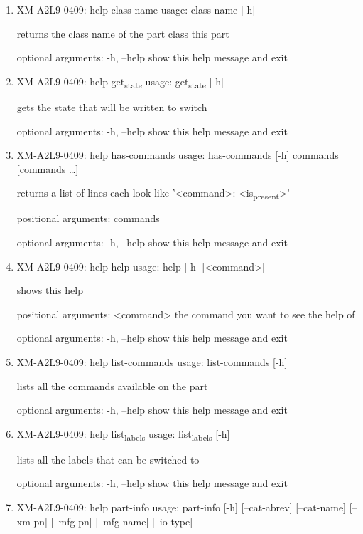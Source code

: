 \documentclass[11pt]{article}
\begin{document}
\begin{enumerate}
\item XM-A2L9-0409: help class-name
\label{sec:orgf703706}
usage: class-name [-h]

returns the class name of the part class this part

optional arguments:
  -h, --help  show this help message and exit

\item XM-A2L9-0409: help get\textsubscript{state}
\label{sec:org0805d89}
usage: get\textsubscript{state} [-h]

gets the state that will be written to switch

optional arguments:
  -h, --help  show this help message and exit

\item XM-A2L9-0409: help has-commands
\label{sec:org7bcfad9}
usage: has-commands [-h] commands [commands \ldots{}]

returns a list of lines each look like '<command>: <is\textsubscript{present}>'

positional arguments:
  commands

optional arguments:
  -h, --help  show this help message and exit

\item XM-A2L9-0409: help help
\label{sec:org667bb58}
usage: help [-h] [<command>]

shows this help

positional arguments:
  <command>   the command you want to see the help of

optional arguments:
  -h, --help  show this help message and exit

\item XM-A2L9-0409: help list-commands
\label{sec:org75099bd}
usage: list-commands [-h]

lists all the commands available on the part

optional arguments:
  -h, --help  show this help message and exit

\item XM-A2L9-0409: help list\textsubscript{labels}
\label{sec:orgd1f997f}
usage: list\textsubscript{labels} [-h]

lists all the labels that can be switched to

optional arguments:
  -h, --help  show this help message and exit

\item XM-A2L9-0409: help part-info
\label{sec:orgcc5c705}
usage: part-info  [-h] [--cat-abrev] [--cat-name] [--xm-pn] [--mfg-pn] [--mfg-name]
        [--io-type]


\end{enumerate}
\end{document}
